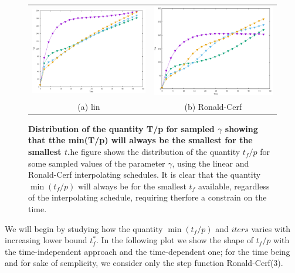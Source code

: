        \begin{figure}[ht]
        \centering
        \begin{tabular}{cc}
          \includegraphics[width=75mm]{./figures/sampled_t_over_p/T_p_lin.pdf} &   \includegraphics[width=75mm]{./figures/sampled_t_over_p/T_p_cerf.pdf} \\
        (a) lin & (b) Ronald-Cerf\\[6pt]
        \end{tabular}
        \caption[$t_f/p$ distribution for sampled $\gamma$ showing that the minimum will always be for the smallest $t$ ]{\textbf{Distribution of the quantity T/p for sampled $\gamma$ showing that tthe min(T/p) will always be the smallest for the smallest $t$.}he figure shows the distribution of the quantity $t_f/p$ for some sampled values of the parameter $\gamma$, using the linear and Ronald-Cerf interpolating schedules. It is clear that the quantity $\min(t_f/p)$ will always be for the smallest $t_f$ available, regardless of the interpolating schedule, requiring therfore a constrain on the time.}
        \end{figure}

         We will begin by studying how the quantity $\min(t_f/p)$ and $iters$ varies with increasing lower bound $t_f^*$.
         In the following plot we show the shape of $t_f/p$ with the time-independent approach and the time-dependent one; for the time being and for sake of semplicity, we consider only the step function Ronald-Cerf(3).

